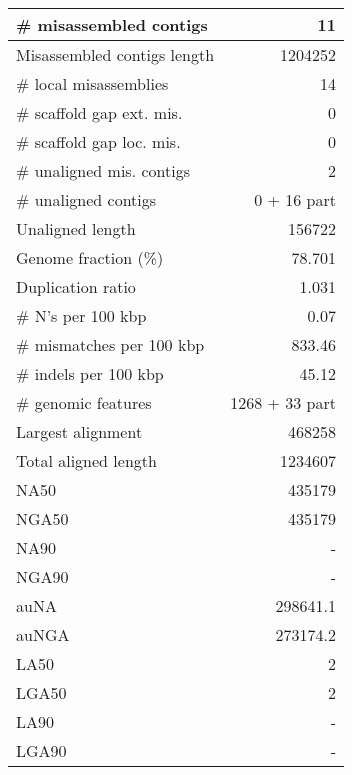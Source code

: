 \documentclass[12pt,a4paper]{article}
\begin{document}
\begin{table}[ht]
\begin{center}
\begin{tabular}{|l*{1}{|r}|}
\# misassembled contigs & 11 \\ \hline
Misassembled contigs length & 1204252 \\ \hline
\# local misassemblies & 14 \\ \hline
\# scaffold gap ext. mis. & 0 \\ \hline
\# scaffold gap loc. mis. & 0 \\ \hline
\# unaligned mis. contigs & 2 \\ \hline
\# unaligned contigs & 0 + 16 part \\ \hline
Unaligned length & 156722 \\ \hline
Genome fraction (\%) & 78.701 \\ \hline
Duplication ratio & 1.031 \\ \hline
\# N's per 100 kbp & 0.07 \\ \hline
\# mismatches per 100 kbp & 833.46 \\ \hline
\# indels per 100 kbp & 45.12 \\ \hline
\# genomic features & 1268 + 33 part \\ \hline
Largest alignment & 468258 \\ \hline
Total aligned length & 1234607 \\ \hline
NA50 & 435179 \\ \hline
NGA50 & 435179 \\ \hline
NA90 & - \\ \hline
NGA90 & - \\ \hline
auNA & 298641.1 \\ \hline
auNGA & 273174.2 \\ \hline
LA50 & 2 \\ \hline
LGA50 & 2 \\ \hline
LA90 & - \\ \hline
LGA90 & - \\ \hline
\end{tabular}
\end{center}
\end{table}
\end{document}
